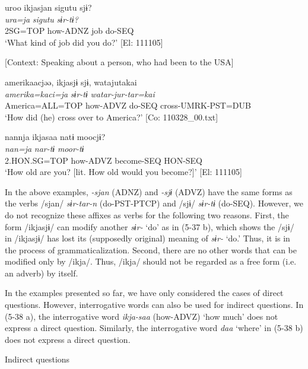 \ea \label{ex:5:37}  \ea \label{ex:5:a} %
\glll  uroo  ikjasjan  sigutu  sjɨ?\\
\textit{ura=ja}  \textit{}  \textit{sigutu}  \textit{sɨr-tɨ?}\\
2SG=TOP  how-ADNZ  job  do-SEQ\\
\glt ‘What kind of job did you do?’ [El: 111105]

 \ex \label{ex:5:b} [Context: Speaking about a person, who had been to the USA]

\glll  {\textbar}amerika{\textbar}acjəə,  ikjasjɨ  sjɨ,  watajutakai\\
\textit{amerika=kaci=ja}  \textit{}  \textit{sɨr-tɨ}  \textit{watar-jur-tar=kai}\\
America=ALL=TOP  how-ADVZ  do-SEQ  cross-UMRK-PST=DUB\\
\glt ‘How did (he) cross over to America?’ [Co: 110328\_00.txt]

 \ex \label{ex:5:c} %
\glll  nannja  ikjasaa  natɨ  moocjɨ?\\
\textit{nan=ja}  \textit{}  \textit{nar-tɨ}  \textit{moor-tɨ}\\
2.HON.SG=TOP  how-ADVZ  become-SEQ  HON-SEQ\\
\glt ‘How old are you? [lit. How old would you become?]’ [El: 111105]
\z
\z

In the above examples, \textit{{}-sjan} (ADNZ) and \textit{{}-sjɨ} (ADVZ) have the same forms as the verbs /sjan/ \textit{sɨr-tar-n} (do-PST-PTCP) and /sjɨ/ \textit{sɨr-tɨ} (do-SEQ). However, we do not recognize these affixes as verbs for the following two reasons. First, the form /ikjasjɨ/ can modify another \textit{sɨr-} ‘do’ as in (5-37 b), which shows the /sjɨ/ in /ikjasjɨ/ has lost its (supposedly original) meaning of \textit{sɨr-} ‘do.’ Thus, it is in the process of grammaticalization. Second, there are no other words that can be modified only by /ikja/. Thus, /ikja/ should not be regarded as a free form (i.e. an adverb) by itself.

  In the examples presented so far, we have only considered the cases of direct questions. However, interrogative words can also be used for indirect questions. In (5-38 a), the interrogative word \textit{ikja-saa} (how-ADVZ) ‘how much’ does not express a direct question. Similarly, the interrogative word \textit{daa} ‘where’ in (5-38 b) does not express a direct question.

\ea \label{ex:5:38}   Indirect questions

